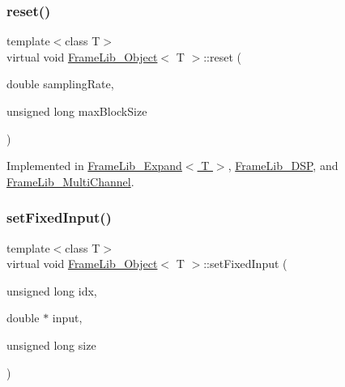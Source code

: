 \mbox{\label{class_frame_lib___object_aeb02311ab422dd569aeb982e31a66893}} 
\subsubsection{\texorpdfstring{reset()}{reset()}}
{\footnotesize\ttfamily template$<$class T$>$ \\
virtual void \hyperlink{class_frame_lib___object}{Frame\+Lib\+\_\+\+Object}$<$ T $>$\+::reset (\begin{DoxyParamCaption}\item[{double}]{sampling\+Rate,  }\item[{unsigned long}]{max\+Block\+Size }\end{DoxyParamCaption})\hspace{0.3cm}{\ttfamily [pure virtual]}}



Implemented in \hyperlink{class_frame_lib___expand_a579f16ec32e05ff84ee766038012fc3f}{Frame\+Lib\+\_\+\+Expand$<$ T $>$}, \hyperlink{class_frame_lib___d_s_p_ad253c096a1c7cc236804dfd1f2e650ec}{Frame\+Lib\+\_\+\+D\+SP}, and \hyperlink{class_frame_lib___multi_channel_af27f3dca507c48459452be825b4c0c72}{Frame\+Lib\+\_\+\+Multi\+Channel}.

\mbox{\label{class_frame_lib___object_a0d3bed42a21ebf248366f4457722beff}} 
\subsubsection{\texorpdfstring{set\+Fixed\+Input()}{setFixedInput()}}
{\footnotesize\ttfamily template$<$class T$>$ \\
virtual void \hyperlink{class_frame_lib___object}{Frame\+Lib\+\_\+\+Object}$<$ T $>$\+::set\+Fixed\+Input (\begin{DoxyParamCaption}\item[{unsigned long}]{idx,  }\item[{double $\ast$}]{input,  }\item[{unsigned long}]{size }\end{DoxyParamCaption})\hspace{0.3cm}{\ttfamily [pure virtual]}}



